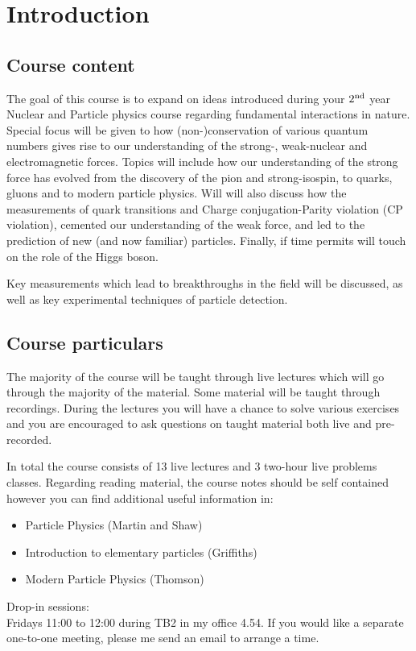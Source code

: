 

\section{Introduction}
\subsection{Course content}
The goal of this course is to expand on ideas
introduced during your $2^{\rm nd}$ year Nuclear and Particle physics 
course regarding fundamental interactions in nature. Special focus will be given to how (non-)conservation of various quantum numbers gives rise to our understanding of the strong-, weak-nuclear and electromagnetic forces. Topics will include 
how our understanding of the strong force has evolved from the discovery of the pion and strong-isospin, to quarks, gluons and to modern particle physics. Will will also discuss how the measurements of quark transitions and Charge conjugation-Parity violation (CP violation), cemented our understanding of the weak force, and led to the prediction of new (and now familiar) particles. Finally, if time permits will touch on the role of the Higgs boson.

Key measurements which lead to breakthroughs in the field will be discussed, as well as key experimental techniques of particle detection.

\subsection{Course particulars}
The majority of the course will be taught through live lectures which will go through the majority of the material.
Some material will be taught through recordings. During the lectures you will have a chance to solve various exercises
and you are encouraged to ask questions on taught material both live and pre-recorded. 

In total the course consists of 13 live lectures and 3 two-hour live problems classes. 
Regarding reading material, the course notes should be self contained however you can find additional useful information in:
\begin{itemize}
\item Particle Physics (Martin and Shaw)
\item Introduction to elementary particles (Griffiths)
\item Modern Particle Physics (Thomson)
\end{itemize}
Drop-in sessions: \\
Fridays 11:00 to 12:00 during TB2 in my office 4.54.
If you would like a separate one-to-one meeting, please me send an email to arrange a time.

